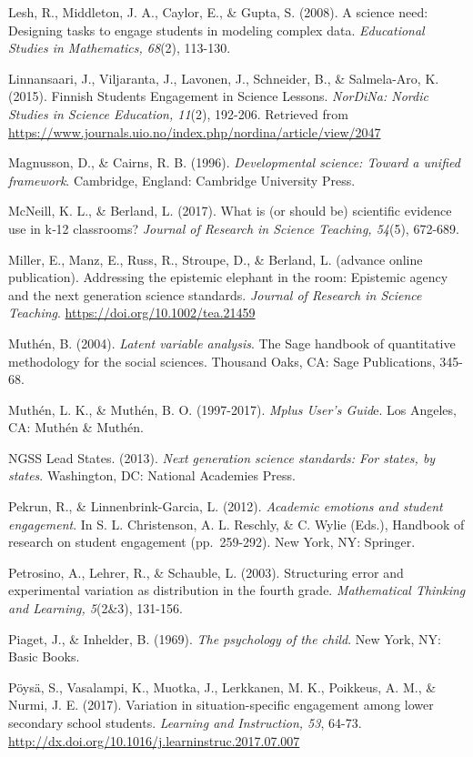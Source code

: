 \documentclass[]{book}
\theoremstyle{definition}
\theoremstyle{definition}
\theoremstyle{definition}
\theoremstyle{remark}
\begin{document}
Lesh, R., Middleton, J. A., Caylor, E., \& Gupta, S. (2008). A science
need: Designing tasks to engage students in modeling complex data.
\emph{Educational Studies in Mathematics, 68}(2), 113-130.

Linnansaari, J., Viljaranta, J., Lavonen, J., Schneider, B., \&
Salmela-Aro, K. (2015). Finnish Students Engagement in Science Lessons.
\emph{NorDiNa: Nordic Studies in Science Education, 11}(2), 192-206.
Retrieved from
\url{https://www.journals.uio.no/index.php/nordina/article/view/2047}

Magnusson, D., \& Cairns, R. B. (1996). \emph{Developmental science:
Toward a unified framework}. Cambridge, England: Cambridge University
Press.

McNeill, K. L., \& Berland, L. (2017). What is (or should be) scientific
evidence use in k‐12 classrooms? \emph{Journal of Research in Science
Teaching, 54}(5), 672-689.

Miller, E., Manz, E., Russ, R., Stroupe, D., \& Berland, L. (advance
online publication). Addressing the epistemic elephant in the room:
Epistemic agency and the next generation science standards.
\emph{Journal of Research in Science Teaching}.
\url{https://doi.org/10.1002/tea.21459}

Muthén, B. (2004). \emph{Latent variable analysis}. The Sage handbook of
quantitative methodology for the social sciences. Thousand Oaks, CA:
Sage Publications, 345-68.

Muthén, L. K., \& Muthén, B. O. (1997-2017). \emph{Mplus User's Guid}e.
Los Angeles, CA: Muthén \& Muthén.

NGSS Lead States. (2013). \emph{Next generation science standards: For
states, by states}. Washington, DC: National Academies Press.

Pekrun, R., \& Linnenbrink-Garcia, L. (2012). \emph{Academic emotions
and student engagement}. In S. L. Christenson, A. L. Reschly, \& C.
Wylie (Eds.), Handbook of research on student engagement (pp.~259-292).
New York, NY: Springer.

Petrosino, A., Lehrer, R., \& Schauble, L. (2003). Structuring error and
experimental variation as distribution in the fourth grade.
\emph{Mathematical Thinking and Learning, 5}(2\&3), 131-156.

Piaget, J., \& Inhelder, B. (1969). \emph{The psychology of the child}.
New York, NY: Basic Books.

Pöysä, S., Vasalampi, K., Muotka, J., Lerkkanen, M. K., Poikkeus, A. M.,
\& Nurmi, J. E. (2017). Variation in situation-specific engagement among
lower secondary school students. \emph{Learning and Instruction, 53},
64-73. \url{http://dx.doi.org/10.1016/j.learninstruc.2017.07.007}
\end{document}
